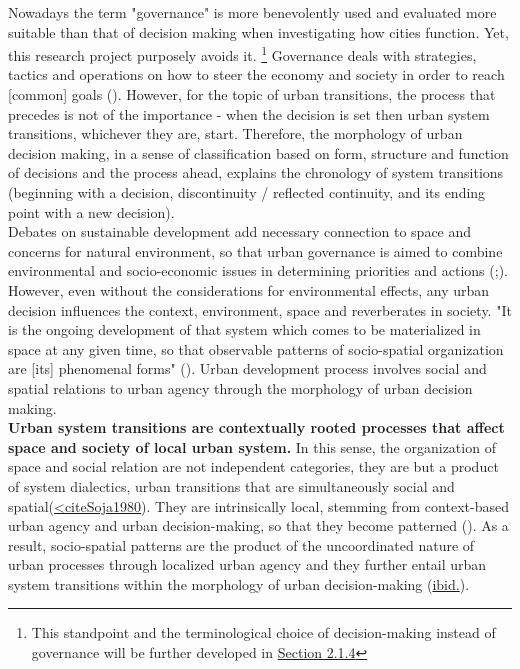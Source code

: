 \documentclass[11pt]{report}
\begin{document}
Nowadays the term "governance" is more benevolently used and evaluated more suitable than that of decision making when investigating how cities function.
Yet, this research project purposely avoids it.
\footnote{This standpoint and the terminological choice of decision-making instead of governance will be further developed in \href{Section 2.1.4}{Section 2.1.4}} 
Governance deals with strategies, tactics and operations on how to steer the economy and society in order to reach [common] goals (\href{Pierre}{\cite{PierreAndPeters2000}}).
However, for the topic of urban transitions, the process that precedes is not of the importance - when the decision is set then urban system transitions, whichever they are, start.
Therefore, the morphology of urban decision making, in a sense of classification based on form, structure and function of decisions and the process ahead, explains the chronology of system transitions (beginning with a decision, discontinuity / reflected continuity, and its ending point with a new decision).
\\

Debates on sustainable development add necessary connection to space and concerns for natural environment, so that urban governance is aimed to combine environmental and socio-economic issues in determining priorities and actions (;\href{Hopwood}{\cite{HopwoodEtAl2005????}}).
However, even without the considerations for environmental effects, any urban decision influences the context, environment, space and reverberates in society.
"It is the ongoing development of that system which comes to be materialized in space at any given time, so that observable patterns of socio-spatial organization are [its] phenomenal forms" (\href{Gottdiener}{\cite{Gottdiener2010}}).
Urban development process involves social and spatial relations to urban agency through the morphology of urban decision making.
\\

\textbf{Urban system transitions are contextually rooted processes that affect space and society of local urban system.}
In this sense, the organization of space and social relation are not independent categories, they are but a product of system dialectics, urban transitions that are simultaneously social and spatial(\href{Soja}{<cite{}Soja1980}). They are intrinsically local, stemming from context-based urban agency and urban decision-making, so that they become patterned (\href{Gottdiener}{\cite{Gottdiener1994}}).
As a result, socio-spatial patterns are the product of the uncoordinated nature of urban processes through localized urban agency and they further entail urban system transitions within the morphology of urban decision-making (\href{Gottdiener}{ibid.}).
\\
\end{document}
